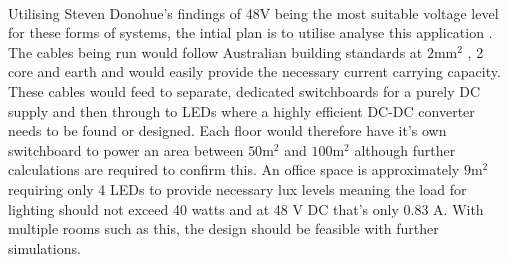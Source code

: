 \paragraph{}
Utilising Steven Donohue's findings of 48V being the most suitable voltage level for these forms  of systems, the intial plan is to utilise analyse this application \cite{Donohue2014}. The cables being run would follow Australian building standards at $2\text{mm}^{2}$ , 2 core and earth and would easily provide the necessary current carrying capacity. These cables would feed to separate, dedicated switchboards for a purely DC supply and then through to LEDs where a highly efficient DC-DC converter needs to be found or designed. Each floor would therefore have it's own switchboard to power an area between $50\text{m}^{2}$ and $100\text{m}^{2}$ although further calculations are required to confirm this. An office space is approximately $9\text{m}^{2}$ requiring only 4 LEDs to provide necessary lux levels meaning the load for lighting should not exceed 40 watts and at 48 V DC that's only 0.83 \si{A}. With multiple rooms such as this, the design should be feasible with further simulations.  

\newpage